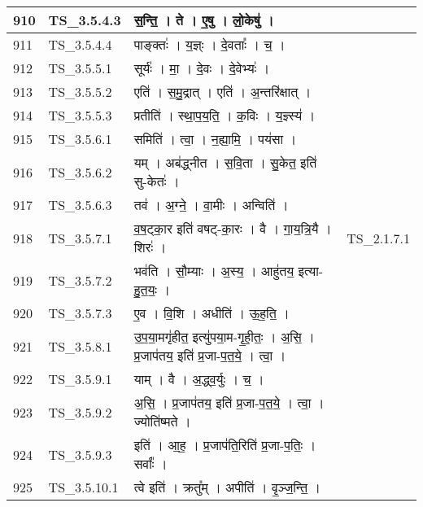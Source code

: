 \documentclass[17pt]{extarticle}
\begin{document}
\begin{longtable}{||p{0.4in}||p{0.9in}||p{4.0in}||p{0.9in}||}
        \hline
            910 & TS\_3.5.4.3 & स॒न्ति॒   ।   ते   ।   ए॒षु   ।   लो॒केषु॑   ।    &      \\
        \hline
            911 & TS\_3.5.4.4 & पाङ्क्तः॑   ।   य॒ज्ञ्ः   ।   दे॒वताः᳚   ।   च॒   ।    &      \\
        \hline
            912 & TS\_3.5.5.1 & सूर्यः॑   ।   मा॒   ।   दे॒वः   ।   दे॒वेभ्यः॑   ।    &      \\
        \hline
            913 & TS\_3.5.5.2 & एति॑   ।   स॒मु॒द्रात्   ।   एति॑   ।   अ॒न्तरि॑क्षात्   ।    &      \\
        \hline
            914 & TS\_3.5.5.3 & प्रतीति॑   ।   स्था॒प॒य॒ति॒   ।   क॒विः   ।   य॒ज्ञ्स्य॑   ।    &      \\
        \hline
            915 & TS\_3.5.6.1 & समिति॑   ।   त्वा॒   ।   न॒ह्या॒मि॒   ।   पय॑सा   ।    &      \\
        \hline
            916 & TS\_3.5.6.2 & यम्   ।   अब॑द्ध्नीत   ।   स॒वि॒ता   ।   सु॒केत॒ इति॑ सु{-}केतः॑   ।    &      \\
        \hline
            917 & TS\_3.5.6.3 & तव॑   ।   अ॒ग्ने॒   ।   वा॒मीः   ।   अन्विति॑   ।    &      \\
        \hline
            918 & TS\_3.5.7.1 & व॒ष॒ट्का॒र इति॑ वषट्{-}का॒रः   ।   वै   ।   गा॒य॒त्रि॒यै   ।   शिरः॑   ।    & TS\_2.1.7.1        \\
        \hline
            919 & TS\_3.5.7.2 & भव॑ति   ।   सौ॒म्याः   ।   अ॒स्य॒   ।   आहु॑तय॒ इत्या{-}हु॒त॒यः॒   ।    &      \\
        \hline
            920 & TS\_3.5.7.3 & ए॒व   ।   वि॒शि   ।   अधीति॑   ।   ऊ॒ह॒ति॒   ।    &      \\
        \hline
            921 & TS\_3.5.8.1 & उ॒प॒या॒मगृ॑हीत॒ इत्यु॑पया॒म{-}गृ॒ही॒तः॒   ।   अ॒सि॒   ।   प्र॒जाप॑तय॒ इति॑ प्र॒जा{-}प॒त॒ये॒   ।   त्वा॒   ।    &      \\
        \hline
            922 & TS\_3.5.9.1 & याम्   ।   वै   ।   अ॒द्ध्व॒र्युः   ।   च॒   ।    &      \\
        \hline
            923 & TS\_3.5.9.2 & अ॒सि॒   ।   प्र॒जाप॑तय॒ इति॑ प्र॒जा{-}प॒त॒ये॒   ।   त्वा॒   ।   ज्योति॑ष्मते   ।    &      \\
        \hline
            924 & TS\_3.5.9.3 & इति॑   ।   आ॒ह॒   ।   प्र॒जाप॑ति॒रिति॑ प्र॒जा{-}प॒तिः॒   ।   सर्वाः᳚   ।    &      \\
        \hline
            925 & TS\_3.5.10.1 & त्वे इति॑   ।   क्रतु᳚म्   ।   अपीति॑   ।   वृ॒ञ्ज॒न्ति॒   ।    &      \\

\end{longtable}
\end{document}
